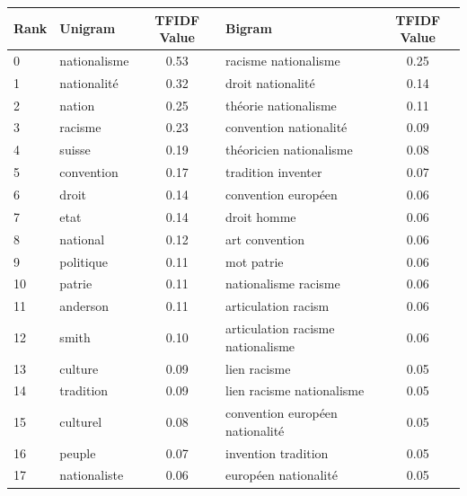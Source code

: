 \documentclass[11pt]{article}
\begin{document}
\begin{table}[H]
\begin{center}
\begin{small}
\label{TFIDF_Terms_Top_Twenty_Fr}
\begin{tabular*}{\textwidth}{|l|| @{\extracolsep{\fill}} l c || l c |} 
\hline
Rank & Unigram & TFIDF Value  & Bigram & TFIDF Value \\
\hline
\hline
0   &     nationalisme  &  0.53  &            racisme nationalisme  &  0.25  \\
1   &        nationalité   &  0.32  &         droit nationalité  &  0.14  \\
2   &      nation  &  0.25  &            théorie nationalisme  &  0.11  \\
3   &        racisme  &  0.23  &         convention nationalité  &  0.09  \\
4   &        suisse   &  0.19  &            théoricien nationalisme  &  0.08  \\
5   &       convention   &  0.17  &        tradition inventer  &  0.07  \\
6   &       droit   &  0.14  &             convention européen  &  0.06  \\
7   &           etat   &  0.14  &      droit homme  &  0.06  \\
8   &       national   &  0.12  &           art convention  &  0.06  \\
9   &    politique   &  0.11  &         mot patrie  &  0.06  \\
10  &     patrie   &  0.11  &          nationalisme racisme &  0.06  \\
11  &          anderson   &  0.11  &         articulation racism &  0.06  \\
12  &    smith   &  0.10  &articulation racisme nationalisme  &  0.06  \\
13  &         culture   &  0.09  &      lien racisme  &  0.05  \\
14  &         tradition   &  0.09  &         lien racisme nationalisme  &  0.05  \\
15  &      culturel   &  0.08  &         convention européen nationalité  &  0.05  \\
16  &       peuple   &  0.07  &           invention tradition  &  0.05  \\
17  &       nationaliste   &  0.06  &        européen nationalité  &  0.05  \\

\end{tabular*}
\end{small}
\end{center}
\end{table}
\end{document}

